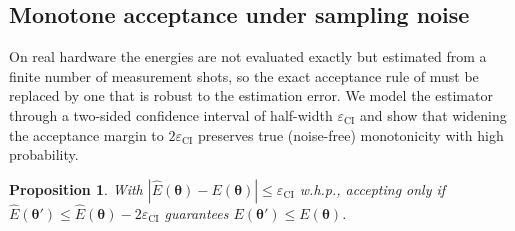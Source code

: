\documentclass[11pt]{article}
\newtheorem{proposition}[theorem]{Proposition}
\theoremstyle{plain}
\theoremstyle{plain}
\begin{document}
\subsection{Monotone acceptance under sampling noise}\label{app:sampling}
On real hardware the energies are not evaluated exactly but estimated
from a finite number of measurement shots, so the exact acceptance rule
of  must be replaced by one that is robust to the
estimation error.  We model the estimator through a two-sided confidence
interval of half-width $\varepsilon_{\mathrm{CI}}$ and show that
widening the acceptance margin to $2\varepsilon_{\mathrm{CI}}$ preserves
true (noise-free) monotonicity with high probability.
\begin{proposition}\label{prop:finite_shots}
  With $|\hat{E}(\bm\theta)-E(\bm\theta)|\le\varepsilon_{\mathrm{CI}}$
  w.h.p., accepting only if
  $\hat{E}(\bm\theta')\le\hat{E}(\bm\theta)-2\varepsilon_{\mathrm{CI}}$
  guarantees $E(\bm\theta')\le E(\bm\theta)$.
\end{proposition}
\end{document}
